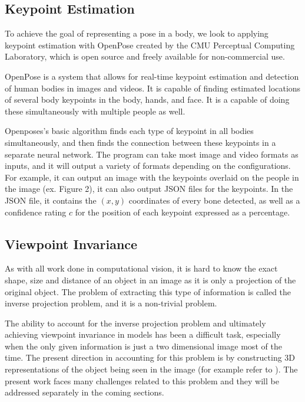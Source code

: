 \documentclass{article}
\begin{document}
\subsection{Keypoint Estimation}

To achieve the goal of representing a pose in a body, we look to applying keypoint estimation with OpenPose \citep{cao2017realtime} \citep{simon2017hand} \citep{wei2016cpm} created by the CMU Perceptual Computing Laboratory, which is open source and freely available for non-commercial use. 

OpenPose is a system that allows for real-time keypoint estimation and detection of human bodies in images and videos. It is capable of finding estimated locations of several body keypoints in the body, hands, and face. It is a capable of doing these simultaneously with multiple people as well. 

Openposes’s	 basic algorithm finds each type of keypoint in all bodies simultaneously, and then finds the connection between these keypoints in a separate neural network. The program can take most image and video formats as inputs, and it will output a variety of formats depending on the configurations. For example, it can output an image with the keypoints overlaid on the people in the image (ex. Figure 2), it can also output JSON files for the keypoints. In the JSON file, it contains the $(x,y)$ coordinates of every bone detected, as well as a confidence rating $c$ for the position of each keypoint expressed as a percentage.

\subsection{Viewpoint Invariance}

As with all work done in computational vision, it is hard to know the exact shape, size and distance of an object in an image as it is only a projection of the original object. The problem of extracting this type of information is called the inverse projection problem, and it is a non-trivial problem.

The ability to account for the inverse projection problem and ultimately achieving viewpoint invariance in models has been a difficult task, especially when the only given information is just a two dimensional image most of the time. The present direction in accounting for this problem is by constructing 3D representations of the object being seen in the image (for example refer to \citep{shin2018pixels} ). The present work faces many challenges related to this problem and they will be addressed separately in the coming sections.
\end{document}
